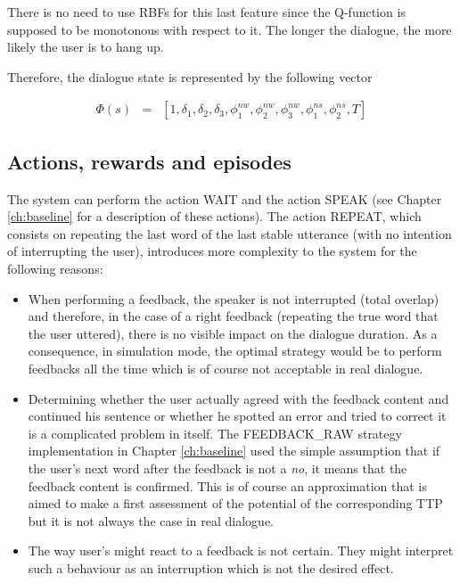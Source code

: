        	There is no need to use RBFs for this last feature since the Q-function is supposed to be monotonous with respect to it. The longer the dialogue, the more likely the user is to hang up.
        
        Therefore, the dialogue state is represented by the following vector
        
				\begin{eqnarray}
					\Phi(s) & = & [1,\delta_1,\delta_2,\delta_3,\phi^{nw}_1,\phi^{nw}_2,\phi^{nw}_3,\phi^{ns}_1,\phi^{ns}_2,T]
				\end{eqnarray}
            
   	\subsection{Actions, rewards and episodes}
    
    	The system can perform the action WAIT and the action SPEAK (see Chapter \ref{ch:baseline} for a description of these actions). The action REPEAT, which consists on repeating the last word of the last stable utterance (with no intention of interrupting the user), introduces more complexity to the system for the following reasons:
			
			\begin{itemize}
				\item When performing a feedback, the speaker is not interrupted (total overlap) and therefore, in the case of a right feedback (repeating the true word that the user uttered), there is no visible impact on the dialogue duration. As a consequence, in simulation mode, the optimal strategy would be to perform feedbacks all the time which is of course not acceptable in real dialogue.
				\item Determining whether the user actually agreed with the feedback content and continued his sentence or whether he spotted an error and tried to correct it is a complicated problem in itself. The FEEDBACK\_RAW strategy implementation in Chapter \ref{ch:baseline} used the simple assumption that if the user's next word after the feedback is not a \textit{no}, it means that the feedback content is confirmed. This is of course an approximation that is aimed to make a first assessment of the potential of the corresponding TTP but it is not always the case in real dialogue.
				\item The way user's might react to a feedback is not certain. They might interpret such a behaviour as an interruption which is not the desired effect.
			\end{itemize}
			
